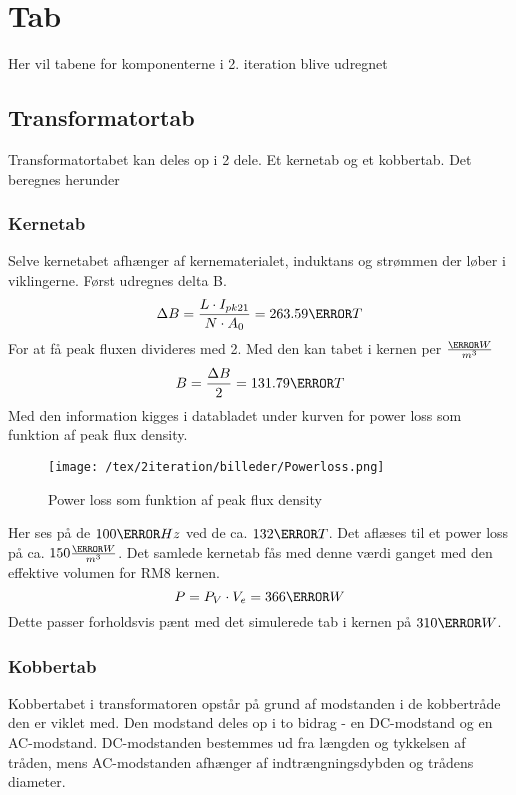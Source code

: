 

\section{Tab}
Her vil tabene for komponenterne i 2. iteration blive udregnet

\subsection{Transformatortab}
Transformatortabet kan deles op i 2 dele. Et kernetab og et kobbertab. Det beregnes herunder

\subsubsection{Kernetab}
Selve kernetabet afhænger af kernematerialet, induktans og strømmen der løber i viklingerne. Først udregnes delta B.
\begin{equation} \label{DeltaB}
\Delta B = \frac{L \cdot I_{pk21}}{N \cdot A_0} = 263.59\milli T
\end{equation}
For at få peak fluxen divideres med 2. Med den kan tabet i kernen per $\frac{\kilo W}{m^3}$
\begin{equation} \label{B}
B = \frac{\Delta B}{2} = 131.79\milli T
\end{equation}
Med den information kigges i databladet under kurven for power loss som funktion af peak flux density.
\begin{figure}[H]
	\center
	\texttt{[image: /tex/2iteration/billeder/Powerloss.png]}
	\caption{Power loss som funktion af peak flux density}
	\label{fig: Powerloss}
\end{figure}
Her ses på de $100\kilo Hz$ ved de ca. $132\milli T$. Det aflæses til et power loss på ca. $150\frac{\kilo W}{m^3}$.
Det samlede kernetab fås med denne værdi ganget med den effektive volumen for RM8 kernen.
\begin{equation} \label{DeltaB}
P = P_V \cdot V_e = 366\milli W
\end{equation}
Dette passer forholdsvis pænt med det simulerede tab i kernen på $310\milli W$.

\subsubsection{Kobbertab}
Kobbertabet i transformatoren opstår på grund af modstanden i de kobbertråde den er viklet med. Den modstand deles op i to bidrag - en DC-modstand og en AC-modstand. DC-modstanden bestemmes ud fra længden og tykkelsen af tråden, mens AC-modstanden afhænger af indtrængningsdybden og trådens diameter. 

